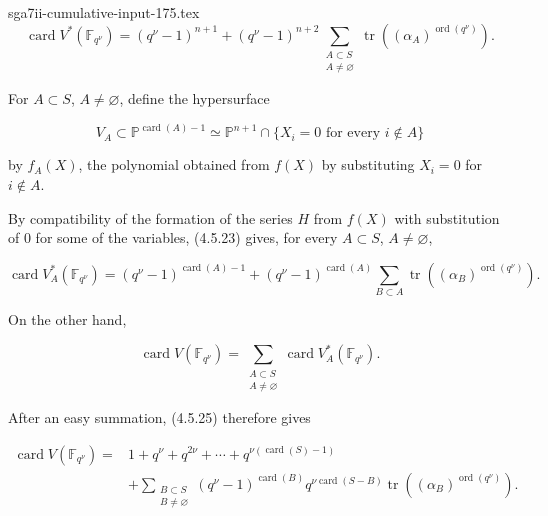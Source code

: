 \begin{filecontents*}{sga7ii-cumulative-input-175.tex}
\begin{equation}\tag{4.5.23}
\operatorname{card}V^*(\mathbb F_{q^\nu})
=(q^\nu-1)^{n+1}
+(q^\nu-1)^{n+2}
\sum_{\substack{A\subset S\\A\ne\varnothing}}
\operatorname{tr}\!\left((\alpha_A)^{\operatorname{ord}(q^\nu)}\right).
\end{equation}

For $A\subset S$, $A\ne\varnothing$, define the hypersurface

\begin{equation}\tag{4.5.24}
V_A\subset\mathbb P^{\operatorname{card}(A)-1}
\simeq
\mathbb P^{n+1}\cap
\{X_i=0\text{ for every }i\notin A\}
\end{equation}

by $f_A(X)$, the polynomial obtained from $f(X)$ by substituting $X_i=0$
for $i\notin A$.

By compatibility of the formation of the series $H$ from $f(X)$ with
substitution of $0$ for some of the variables, (4.5.23) gives, for every
$A\subset S$, $A\ne\varnothing$,

\begin{equation}\tag{4.5.25}
\operatorname{card}V_A^*(\mathbb F_{q^\nu})
=(q^\nu-1)^{\operatorname{card}(A)-1}
+(q^\nu-1)^{\operatorname{card}(A)}
\sum_{B\subset A}
\operatorname{tr}\!\left((\alpha_B)^{\operatorname{ord}(q^\nu)}\right).
\end{equation}

On the other hand,

\begin{equation}\tag{4.5.26}
\operatorname{card}V(\mathbb F_{q^\nu})
=\sum_{\substack{A\subset S\\A\ne\varnothing}}
\operatorname{card}V_A^*(\mathbb F_{q^\nu}).
\end{equation}

After an easy summation, (4.5.25) therefore gives

\begin{equation}\tag{4.5.27}
\begin{aligned}
\operatorname{card}V(\mathbb F_{q^\nu})
={}&1+q^\nu+q^{2\nu}+\cdots
+q^{\nu(\operatorname{card}(S)-1)}\\
&+\sum_{\substack{B\subset S\\B\ne\varnothing}}
(q^\nu-1)^{\operatorname{card}(B)}
q^{\nu\operatorname{card}(S-B)}
\operatorname{tr}\!\left((\alpha_B)^{\operatorname{ord}(q^\nu)}\right).
\end{aligned}
\end{equation}


\end{filecontents*}
